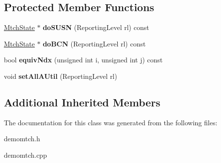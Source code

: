 \subsection*{Protected Member Functions}
\begin{DoxyCompactItemize}
\item 
\hypertarget{class_demo_mtch_1_1_mtch_state_a6891610ea1163e499be356f33afbcd43}{\hyperlink{class_demo_mtch_1_1_mtch_state}{Mtch\-State} $\ast$ {\bfseries do\-S\-U\-S\-N} (Reporting\-Level rl) const }\label{class_demo_mtch_1_1_mtch_state_a6891610ea1163e499be356f33afbcd43}

\item 
\hypertarget{class_demo_mtch_1_1_mtch_state_a9797b5d234245847010e203b83d477a9}{\hyperlink{class_demo_mtch_1_1_mtch_state}{Mtch\-State} $\ast$ {\bfseries do\-B\-C\-N} (Reporting\-Level rl) const }\label{class_demo_mtch_1_1_mtch_state_a9797b5d234245847010e203b83d477a9}

\item 
\hypertarget{class_demo_mtch_1_1_mtch_state_a700815acdb09c6c6b128f1a6cfe6216d}{bool {\bfseries equiv\-Ndx} (unsigned int i, unsigned int j) const }\label{class_demo_mtch_1_1_mtch_state_a700815acdb09c6c6b128f1a6cfe6216d}

\item 
\hypertarget{class_demo_mtch_1_1_mtch_state_af6136ac501980dde51981997ef5cdaec}{void {\bfseries set\-All\-A\-Util} (Reporting\-Level rl)}\label{class_demo_mtch_1_1_mtch_state_af6136ac501980dde51981997ef5cdaec}

\end{DoxyCompactItemize}
\subsection*{Additional Inherited Members}


The documentation for this class was generated from the following files\-:\begin{DoxyCompactItemize}
\item 
demomtch.\-h\item 
demomtch.\-cpp\end{DoxyCompactItemize}
